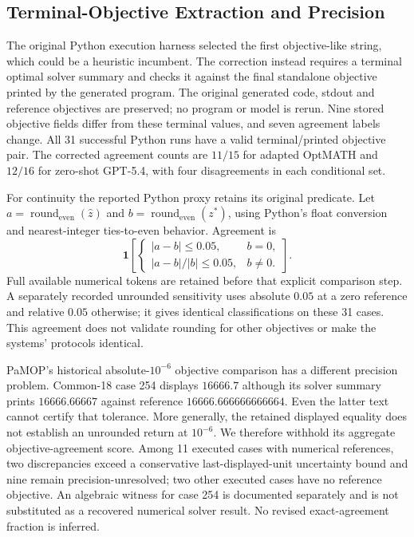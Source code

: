 \subsection{Terminal-Objective Extraction and Precision}
The original Python execution harness selected the first objective-like string, which could be a heuristic incumbent. The correction instead requires a terminal optimal solver summary and checks it against the final standalone objective printed by the generated program. The original generated code, stdout and reference objectives are preserved; no program or model is rerun. Nine stored objective fields differ from these terminal values, and seven agreement labels change. All 31 successful Python runs have a valid terminal/printed objective pair. The corrected agreement counts are $11/15$ for adapted OptMATH and $12/16$ for zero-shot GPT-5.4, with four disagreements in each conditional set.

For continuity the reported Python proxy retains its original predicate. Let $a=\operatorname{round}_{\mathrm{even}}(\hat z)$ and $b=\operatorname{round}_{\mathrm{even}}(z^*)$, using Python's float conversion and nearest-integer ties-to-even behavior. Agreement is
\begin{equation}
 \mathbf{1}\!\left[\begin{cases}|a-b|\leq0.05,&b=0,\\ |a-b|/|b|\leq0.05,&b\ne0.\end{cases}\right].
 \label{eq:common18-objective-proxy}
\end{equation}
Full available numerical tokens are retained before that explicit comparison step. A separately recorded unrounded sensitivity uses absolute $0.05$ at a zero reference and relative $0.05$ otherwise; it gives identical classifications on these 31 cases. This agreement does not validate rounding for other objectives or make the systems' protocols identical.

PaMOP's historical absolute-$10^{-6}$ objective comparison has a different precision problem. Common-18 case 254 displays $16666.7$ although its solver summary prints $16666.66667$ against reference $16666.666666666664$. Even the latter text cannot certify that tolerance. More generally, the retained displayed equality does not establish an unrounded return at $10^{-6}$. We therefore withhold its aggregate objective-agreement score. Among 11 executed cases with numerical references, two discrepancies exceed a conservative last-displayed-unit uncertainty bound and nine remain precision-unresolved; two other executed cases have no reference objective. An algebraic witness for case 254 is documented separately and is not substituted as a recovered numerical solver result. No revised exact-agreement fraction is inferred.

